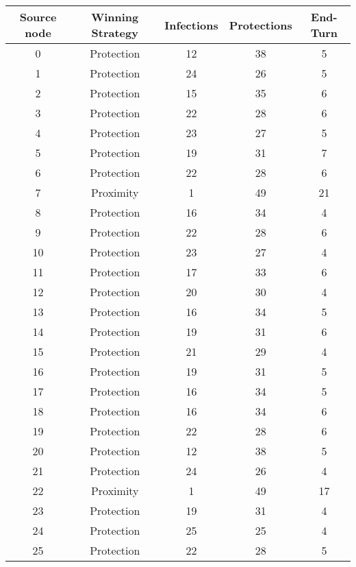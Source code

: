 \documentclass[results.tex]{subfiles}
\begin{document}
\begin{center}
  \begin{tabular}{| c || c | c | c | c |}
    \hline
    {\bfseries Source node} & {\bfseries Winning Strategy} & {\bfseries Infections} & {\bfseries Protections} & {\bfseries End-Turn} \\  %
    \hline\hline
    0 & Protection & 12 & 38 & 5 \\ 
    \hline
    1 & Protection & 24 & 26 & 5 \\ 
    \hline
    2 & Protection & 15 & 35 & 6 \\ 
    \hline
    3 & Protection & 22 & 28 & 6 \\ 
    \hline
    4 & Protection & 23 & 27 & 5 \\ 
    \hline
    5 & Protection & 19 & 31 & 7 \\ 
    \hline
    6 & Protection & 22 & 28 & 6 \\ 
    \hline
    7 & Proximity & 1 & 49 & 21 \\ 
    \hline
    8 & Protection & 16 & 34 & 4 \\ 
    \hline
    9 & Protection & 22 & 28 & 6 \\ 
    \hline
    10 & Protection & 23 & 27 & 4 \\ 
    \hline
    11 & Protection & 17 & 33 & 6 \\ 
    \hline
    12 & Protection & 20 & 30 & 4 \\ 
    \hline
    13 & Protection & 16 & 34 & 5 \\ 
    \hline
    14 & Protection & 19 & 31 & 6 \\ 
    \hline
    15 & Protection & 21 & 29 & 4 \\ 
    \hline
    16 & Protection & 19 & 31 & 5 \\ 
    \hline
    17 & Protection & 16 & 34 & 5 \\ 
    \hline
    18 & Protection & 16 & 34 & 6 \\ 
    \hline
    19 & Protection & 22 & 28 & 6 \\ 
    \hline
    20 & Protection & 12 & 38 & 5 \\ 
    \hline
    21 & Protection & 24 & 26 & 4 \\ 
    \hline
    22 & Proximity & 1 & 49 & 17 \\ 
    \hline
    23 & Protection & 19 & 31 & 4 \\ 
    \hline
    24 & Protection & 25 & 25 & 4 \\ 
    \hline
    25 & Protection & 22 & 28 & 5 \\ 

\end{tabular}
\end{center}
\end{document}
